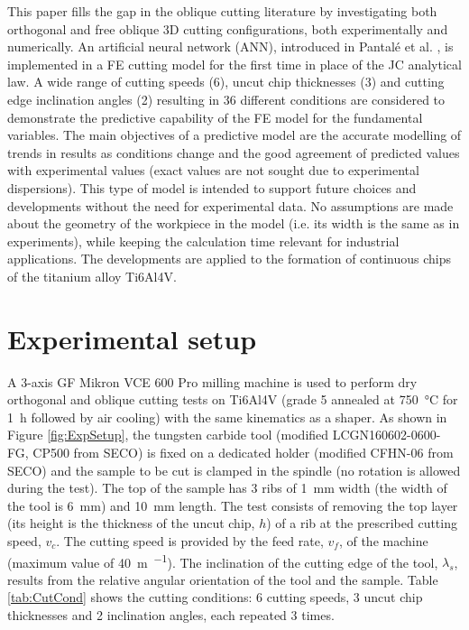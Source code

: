\documentclass[preprint,12pt,times]{elsarticle}
\begin{document}
This paper fills the gap in the oblique cutting literature by investigating both orthogonal and free oblique 3D cutting configurations, both experimentally and numerically. An artificial neural network (ANN), introduced in Pantalé et al. \cite{pantale_Efficient_2022}, is implemented in a FE cutting model for the first time in place of the JC analytical law. A wide range of cutting speeds (6), uncut chip thicknesses (3) and cutting edge inclination angles (2) resulting in 36 different conditions are considered to demonstrate the predictive capability of the FE model for the fundamental variables. The main objectives of a predictive model are the accurate modelling of trends in results as conditions change and the good agreement of predicted values with experimental values (exact values are not sought due to experimental dispersions). This type of model is intended to support future choices and developments without the need for experimental data. No assumptions are made about the geometry of the workpiece in the model (i.e. its width is the same as in experiments), while keeping the calculation time relevant for industrial applications. The developments are applied to the formation of continuous chips of the titanium alloy Ti6Al4V.

\section{Experimental setup}
\label{ExpSet}

A 3-axis GF Mikron VCE 600 Pro milling machine is used to perform dry orthogonal and oblique cutting tests on Ti6Al4V (grade 5 annealed at \qty{750}{\degreeCelsius} for \qty{1}{\hour} followed by air cooling) with the same kinematics as a shaper. As shown in Figure \ref{fig:ExpSetup}, the tungsten carbide tool (modified LCGN160602-0600-FG, CP500 from SECO) is fixed on a dedicated holder (modified CFHN-06 from SECO) and the sample to be cut is clamped in the spindle (no rotation is allowed during the test). The top of the sample has 3 ribs of \qty{1}{\mm} width (the width of the tool is \qty{6}{\mm}) and \qty{10}{\mm} length. The test consists of removing the top layer (its height is the thickness of the uncut chip, $h$) of a rib at the prescribed cutting speed, $v_c$. The cutting speed is provided by the feed rate, $v_f$, of the machine (maximum value of \qty{40}{\metre\per\min}). The inclination of the cutting edge of the tool, $\lambda_s$, results from the relative angular orientation of the tool and the sample. Table \ref{tab:CutCond} shows the cutting conditions: 6 cutting speeds, 3 uncut chip thicknesses and 2 inclination angles, each repeated 3 times.
\end{document}
